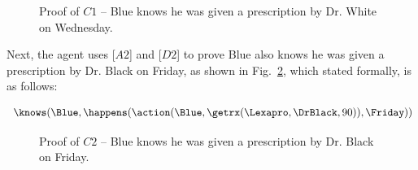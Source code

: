 \begin{figure}[h!] 
\vspace{6pt}
\centering
{}
\caption{Proof of $C1$ -- Blue knows he was given a prescription by Dr. White on 
Wednesday.}
\label{fig:proof_of_c1}
\end{figure}

\noindent Next, the agent uses [$A2$] and [$D2$] to prove Blue also knows he was given a prescription by Dr. Black on Friday, as shown in Fig.~\ref{fig:proof_of_c2}, which stated formally, is as follows:
\begin{footnotesize}
\begin{align*}
[C2] \ \knows(\Blue,\happens(\action(\Blue,\getrx(\Lexapro,\DrBlack,90)),\Friday))
\end{align*}
\end{footnotesize}

\begin{figure}[h!] 
\vspace{6pt}
\centering
{}
\caption{Proof of $C2$ -- Blue knows he was given a prescription by Dr. Black on 
Friday.}
\label{fig:proof_of_c2}
\end{figure}

